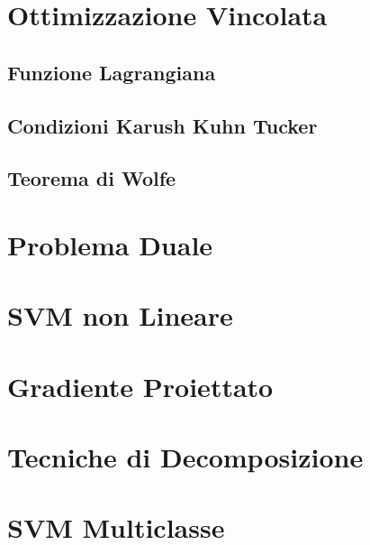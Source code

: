 \documentclass{report}
\begin{document}
\section{Ottimizzazione Vincolata}



\subsection{Funzione Lagrangiana}



\subsection{Condizioni Karush Kuhn Tucker}



\subsection{Teorema di Wolfe}



\section{Problema Duale}



\section{SVM non Lineare}



\section{Gradiente Proiettato}



\section{Tecniche di Decomposizione}



\section{SVM Multiclasse}

 
\end{document}
